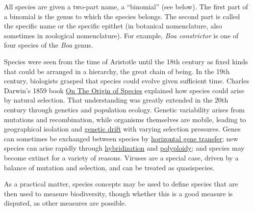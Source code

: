 All species are given a two-part name, a ``binomial'' (see below). The
first part of a binomial is the genus to which the species belongs. The
second part is called the specific name or the specific epithet (in
botanical nomenclature, also sometimes in zoological nomenclature). For
example, \emph{Boa constrictor} is one of four species of the \emph{Boa} genus.

Species were seen from the time of Aristotle until the 18th century as
fixed kinds that could be arranged in a hierarchy, the great chain of
being. In the 19th century, biologists grasped that species could evolve
given sufficient time. Charles Darwin's 1859 book \href{https://en.wikipedia.org/wiki/On_the_Origin_of_Species}{On The Origin of Species}
explained how species could arise by natural selection. That
understanding was greatly extended in the 20th century through genetics
and population ecology. Genetic variability arises from mutations and
recombination, while organisms themselves are mobile, leading to
geographical isolation and \href{https://en.wikipedia.org/wiki/Genetic_drift}{genetic drift} with varying selection
pressures. Genes can sometimes be exchanged between species by
\href{https://en.wikipedia.org/wiki/Horizontal_gene_transfer}{horizontal gene transfer}; new species can arise rapidly through
\href{https://en.wikipedia.org/wiki/Hybrid_(biology)}{hybridization} and \href{https://en.wikipedia.org/wiki/Polyploid}{polyploidy}; and species may become extinct for a
variety of reasons. Viruses are a special case, driven by a balance of
mutation and selection, and can be treated as quasispecies.

As a practical matter, species concepts may be used to define species
that are then used to measure biodiversity, though whether this is a
good measure is disputed, as other measures are possible.

